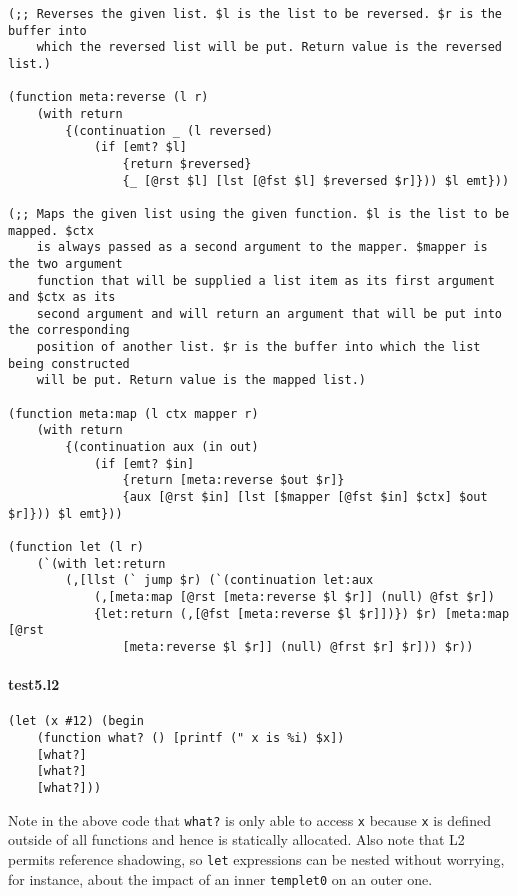 \documentclass[]{article}
\let\oldparagraph\paragraph
\renewcommand{\paragraph}[1]{\oldparagraph{#1}\mbox{}}
\begin{document}
\begin{verbatim}
(;; Reverses the given list. $l is the list to be reversed. $r is the buffer into
    which the reversed list will be put. Return value is the reversed list.)

(function meta:reverse (l r)
    (with return
        {(continuation _ (l reversed)
            (if [emt? $l]
                {return $reversed}
                {_ [@rst $l] [lst [@fst $l] $reversed $r]})) $l emt}))

(;; Maps the given list using the given function. $l is the list to be mapped. $ctx
    is always passed as a second argument to the mapper. $mapper is the two argument
    function that will be supplied a list item as its first argument and $ctx as its
    second argument and will return an argument that will be put into the corresponding
    position of another list. $r is the buffer into which the list being constructed
    will be put. Return value is the mapped list.)

(function meta:map (l ctx mapper r)
    (with return
        {(continuation aux (in out)
            (if [emt? $in]
                {return [meta:reverse $out $r]}
                {aux [@rst $in] [lst [$mapper [@fst $in] $ctx] $out $r]})) $l emt}))

(function let (l r)
    (`(with let:return
        (,[llst (` jump $r) (`(continuation let:aux
            (,[meta:map [@rst [meta:reverse $l $r]] (null) @fst $r])
            {let:return (,[@fst [meta:reverse $l $r]])}) $r) [meta:map [@rst
                [meta:reverse $l $r]] (null) @frst $r] $r])) $r))
\end{verbatim}

\hypertarget{test5.l2}{%
\paragraph{test5.l2}\label{test5.l2}}

\begin{verbatim}
(let (x #12) (begin
    (function what? () [printf (" x is %i) $x])
    [what?]
    [what?]
    [what?]))
\end{verbatim}

Note in the above code that \texttt{what?} is only able to access
\texttt{x} because \texttt{x} is defined outside of all functions and
hence is statically allocated. Also note that L2 permits reference
shadowing, so \texttt{let} expressions can be nested without worrying,
for instance, about the impact of an inner \texttt{templet0} on an outer
one.
\end{document}

